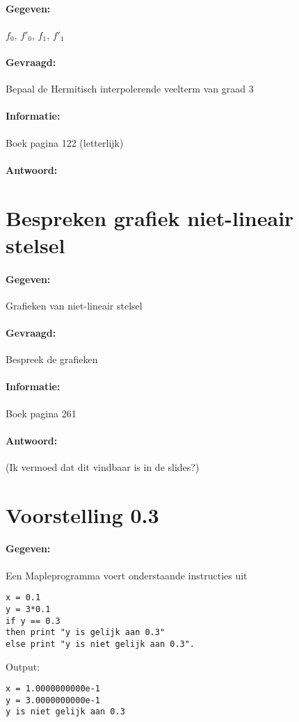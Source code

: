 \documentclass[12pt]{article}
\begin{document}
\paragraph{Gegeven:} $f_0$, $f'_0$,  $f_1$, $f'_1$
\paragraph{Gevraagd:} Bepaal de Hermitisch interpolerende veelterm van graad 3
\paragraph{Informatie:} Boek pagina 122 (letterlijk)
\paragraph{Antwoord:}

\newpage

\section{Bespreken grafiek niet-lineair stelsel}
\paragraph{Gegeven:} Grafieken van niet-lineair stelsel
\paragraph{Gevraagd:} Bespreek de grafieken
\paragraph{Informatie:} Boek pagina 261
\paragraph{Antwoord:} (Ik vermoed dat dit vindbaar is in de slides?)

\newpage


\section{Voorstelling 0.3}
\paragraph{Gegeven:} Een Mapleprogramma voert onderstaande instructies uit
\begin{lstlisting}
x = 0.1
y = 3*0.1
if y == 0.3
then print "y is gelijk aan 0.3"
else print "y is niet gelijk aan 0.3".
\end{lstlisting}
Output:
\begin{lstlisting}
x = 1.0000000000e-1
y = 3.0000000000e-1
y is niet gelijk aan 0.3
\end{lstlisting}
\end{document}
